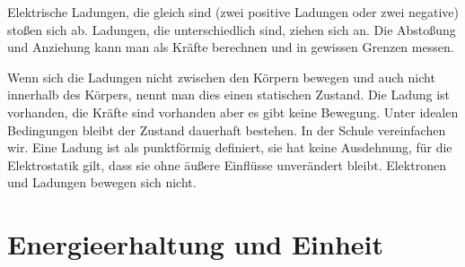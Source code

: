 \documentclass[aspectratio=169, ignorenonframetext]{beamer}
\begin{document}

Elektrische Ladungen, die gleich sind (zwei positive Ladungen oder zwei negative) stoßen sich ab. Ladungen, die unterschiedlich sind, ziehen sich an. Die Abstoßung und Anziehung kann man als Kräfte berechnen und in gewissen Grenzen messen.

Wenn sich die Ladungen nicht zwischen den Körpern bewegen und auch nicht innerhalb des Körpers, nennt man dies einen statischen Zustand. Die Ladung ist vorhanden, die Kräfte sind vorhanden aber es gibt keine Bewegung. Unter idealen Bedingungen bleibt der Zustand dauerhaft bestehen. In der Schule vereinfachen wir. Eine Ladung ist als punktförmig definiert, sie hat keine Ausdehnung, für die Elektrostatik gilt, dass sie ohne äußere Einflüsse unverändert bleibt. Elektronen und Ladungen bewegen sich nicht.

\section[Einheiten]{Energieerhaltung und Einheit}
\end{document}
